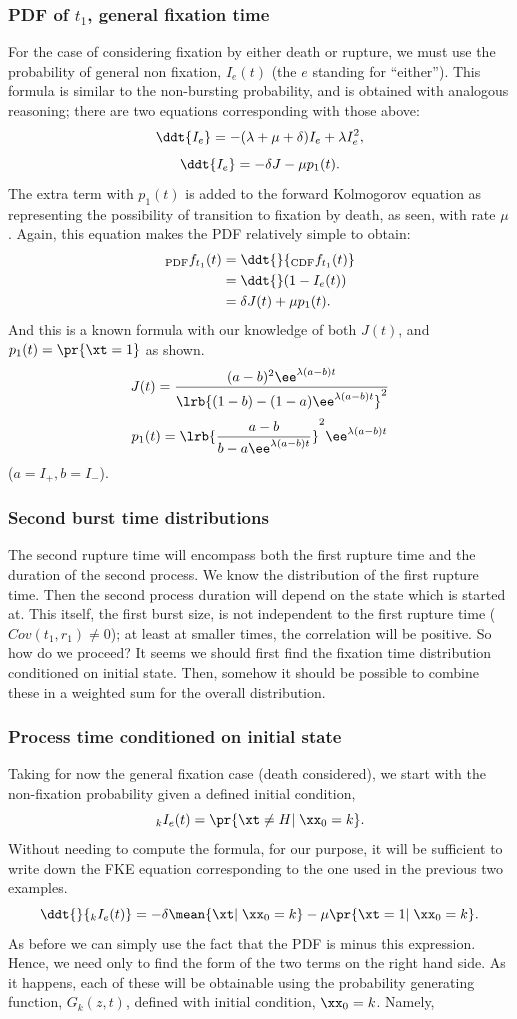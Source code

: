 \subsubsection*{PDF of $t_1$, general fixation time}
For the case of considering fixation by either death or rupture, we must use the probability of general non fixation, $I_e(t)$ (the $e$ standing for ``either''). This formula is similar to the non-bursting probability, and is obtained with analogous reasoning; there are two equations corresponding with those above:
$$\ddt{I_e} = - (\lambda+\mu+\delta) I_e + \lambda I_e^2,$$
$$\ddt{I_e} = -\delta J - \mu p_1(t).$$
The extra term with $p_1(t)$ is added to the forward Kolmogorov equation as representing the possibility of transition to fixation by death, as seen, with rate $\mu$. Again, this equation makes the PDF relatively simple to obtain: 
\begin{align*}
_{\text{PDF}}f_{ t_1}(t) &= \ddt{}{ _{\text{CDF}}f_{ t_1}(t)}\\
&=\ddt{} (1-I_e(t))\\
&= \delta J(t) + \mu p_1(t).
\end{align*}
And this is a known formula with our knowledge of both $J(t)$, and $p_1(t) = \pr{\xt = 1}$ as shown.
$$J(t) = \frac{(a-b)^2\ee^{\lambda(a-b)t}}{\lrb{(1-b) - (1-a)\ee^{\lambda(a-b)t}}^2} $$
$$p_1(t) = \lrb{\frac{a-b}{b - a \ee^{\lambda(a-b)t}}}^2 \ee^{\lambda(a-b)t}$$
($a = I_+, b = I_-$).

\subsubsection*{Second burst time distributions}
The second rupture time will encompass both the first rupture time and the duration of the second process. We know the distribution of the first rupture time. Then the second process duration will depend on the state which is started at. This itself, the first burst size, is not independent to the first rupture time ($Cov(t_1, r_1) \neq 0$); at least at smaller times, the correlation will be positive. So how do we proceed? It seems we should first find the fixation time distribution conditioned on initial state. Then, somehow it should be possible to combine these in a weighted sum for the overall distribution.

\subsubsection*{Process time conditioned on initial state} 
Taking for now the general fixation case (death considered), we start with the non-fixation probability given a defined initial condition,
$$_kI_e(t) = \pr{\xt \neq H |\; \xx_0 = k}.$$
Without needing to compute the formula, for our purpose, it will be sufficient to write down the FKE equation corresponding to the one used in the previous two examples.  
$$\ddt{}{_kI_e(t)} =  -\delta \mean{\xt|\;\xx_0 = k} - \mu \pr{\xt = 1|\;\xx_0 = k}.$$
As before we can simply use the fact that the PDF is minus this expression. Hence, we need only to find the form of the two terms on the right hand side. As it happens, each of these will be obtainable using the probability generating function, $G_k(z,t)$, defined with initial condition, $\xx_0 = k$. Namely,

